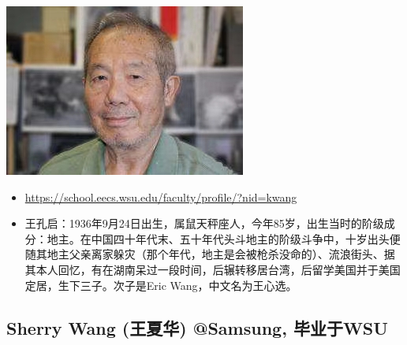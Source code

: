 \documentclass[9pt, b5paper]{article}
\begin{document}
\begin{center}
\includegraphics[width=.9\linewidth]{./pic/KCWang.jpg}
\end{center}
\begin{itemize}
\item \url{https://school.eecs.wsu.edu/faculty/profile/?nid=kwang}
\item 王孔启：1936年9月24日出生，属鼠天秤座人，今年85岁，出生当时的阶级成分：地主。在中国四十年代末、五十年代头斗地主的阶级斗争中，十岁出头便随其地主父亲离家躲灾（那个年代，地主是会被枪杀没命的）、流浪街头、据其本人回忆，有在湖南呆过一段时间，后辗转移居台湾，后留学美国并于美国定居，生下三子。次子是Eric Wang，中文名为王心选。
\end{itemize}
\subsection{Sherry Wang (王夏华) @Samsung, 毕业于WSU}
\label{sec:org6cc3c10}
\end{document}
